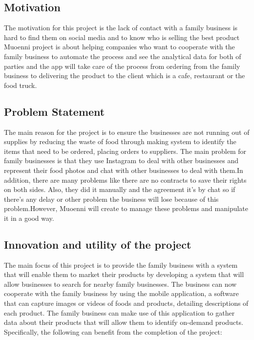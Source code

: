 \documentclass[11pt]{article}
\newcommand\tab[1][1cm]{\hspace*{#1}}
\begin{document}
\subsection{Motivation}


\tab The motivation for this project is the lack of contact with a family business is hard to find them on social media and to know who is selling the best product Muoenni project is about helping companies who want to cooperate with the family business to automate the process and see the analytical data for both of parties and the app will take care of the process from ordering from the family business to delivering the product to the client which is a cafe, restaurant or the food truck.


\subsection{Problem Statement}

\tab The main reason for the project is to ensure the businesses are not running out of supplies by reducing the waste of food through making system to identify the items that need to be ordered, placing orders to suppliers. The main problem for family businesses is that they use Instagram to deal with other businesses and represent their food photos and chat with other businesses to deal with them.In addition, there are many problems like there are no contracts to save their rights on both sides. Also, they did it manually and the agreement it's by chat so if there’s any delay or other problem the business will lose because of this problem.However, Muoenni will create to manage these problems and manipulate it in a good way.

\subsection{Innovation and utility of the project}
\tab The main focus of this project is to provide the family business with a system that will enable them to market their products by developing a system that will allow businesses to search for nearby family businesses. The business can now cooperate with the family business by using the mobile application, a software that can capture images or videos of foods and products, detailing descriptions of each product. The family business can make use of this application to gather data about their products that will allow them to identify on-demand products. Specifically, the following can benefit from the completion of the project:
\end{document}
